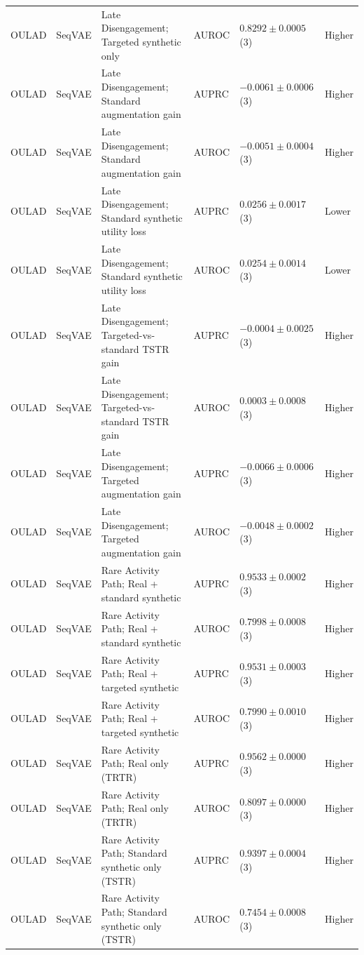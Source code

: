 \begin{longtable}{@{}p{2.25cm}p{2.05cm}p{4.7cm}p{5.0cm}p{2.6cm}p{1.25cm}@{}}
OULAD & SeqVAE & Late Disengagement; Targeted synthetic only & AUROC & $0.8292 \mathbin{\pm} 0.0005$ (3) & Higher \\
OULAD & SeqVAE & Late Disengagement; Standard augmentation gain & AUPRC & $-0.0061 \mathbin{\pm} 0.0006$ (3) & Higher \\
OULAD & SeqVAE & Late Disengagement; Standard augmentation gain & AUROC & $-0.0051 \mathbin{\pm} 0.0004$ (3) & Higher \\
OULAD & SeqVAE & Late Disengagement; Standard synthetic utility loss & AUPRC & $0.0256 \mathbin{\pm} 0.0017$ (3) & Lower \\
OULAD & SeqVAE & Late Disengagement; Standard synthetic utility loss & AUROC & $0.0254 \mathbin{\pm} 0.0014$ (3) & Lower \\
OULAD & SeqVAE & Late Disengagement; Targeted-vs-standard TSTR gain & AUPRC & $-0.0004 \mathbin{\pm} 0.0025$ (3) & Higher \\
OULAD & SeqVAE & Late Disengagement; Targeted-vs-standard TSTR gain & AUROC & $0.0003 \mathbin{\pm} 0.0008$ (3) & Higher \\
OULAD & SeqVAE & Late Disengagement; Targeted augmentation gain & AUPRC & $-0.0066 \mathbin{\pm} 0.0006$ (3) & Higher \\
OULAD & SeqVAE & Late Disengagement; Targeted augmentation gain & AUROC & $-0.0048 \mathbin{\pm} 0.0002$ (3) & Higher \\
OULAD & SeqVAE & Rare Activity Path; Real + standard synthetic & AUPRC & $0.9533 \mathbin{\pm} 0.0002$ (3) & Higher \\
OULAD & SeqVAE & Rare Activity Path; Real + standard synthetic & AUROC & $0.7998 \mathbin{\pm} 0.0008$ (3) & Higher \\
OULAD & SeqVAE & Rare Activity Path; Real + targeted synthetic & AUPRC & $0.9531 \mathbin{\pm} 0.0003$ (3) & Higher \\
OULAD & SeqVAE & Rare Activity Path; Real + targeted synthetic & AUROC & $0.7990 \mathbin{\pm} 0.0010$ (3) & Higher \\
OULAD & SeqVAE & Rare Activity Path; Real only (TRTR) & AUPRC & $0.9562 \mathbin{\pm} 0.0000$ (3) & Higher \\
OULAD & SeqVAE & Rare Activity Path; Real only (TRTR) & AUROC & $0.8097 \mathbin{\pm} 0.0000$ (3) & Higher \\
OULAD & SeqVAE & Rare Activity Path; Standard synthetic only (TSTR) & AUPRC & $0.9397 \mathbin{\pm} 0.0004$ (3) & Higher \\
OULAD & SeqVAE & Rare Activity Path; Standard synthetic only (TSTR) & AUROC & $0.7454 \mathbin{\pm} 0.0008$ (3) & Higher \\

\end{longtable}
